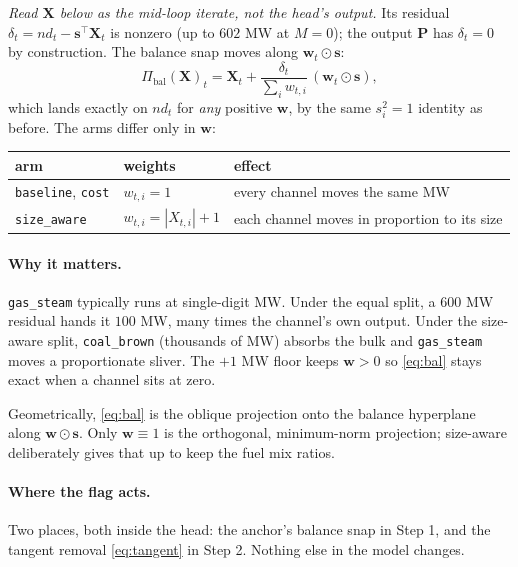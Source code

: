 \documentclass[11pt]{article}
\begin{document}
\emph{Read $\mathbf{X}$ below as the mid-loop iterate, not the head's output.}
Its residual $\delta_t=nd_t-\mathbf{s}^{\!\top}\mathbf{X}_t$ is nonzero (up to
$602$ MW at $M=0$); the output $\mathbf{P}$ has $\delta_t=0$ by construction.
The balance snap moves along $\mathbf{w}_t\odot\mathbf{s}$:
\begin{equation}
\Pi_{\mathrm{bal}}(\mathbf{X})_t=\mathbf{X}_t+\frac{\delta_t}{\sum_i w_{t,i}}\,(\mathbf{w}_t\odot\mathbf{s}),
\label{eq:bal}
\end{equation}
which lands exactly on $nd_t$ for \emph{any} positive $\mathbf{w}$, by the same
$s_i^2=1$ identity as before. The arms differ only in $\mathbf{w}$:
\begin{center}
\begin{tabular}{lll}
\toprule
arm & weights & effect \\
\midrule
\texttt{baseline}, \texttt{cost} & $w_{t,i}=1$ & every channel moves the same MW \\
\texttt{size\_aware} & $w_{t,i}=|X_{t,i}|+1$ & each channel moves in proportion to its size \\
\bottomrule
\end{tabular}
\end{center}

\paragraph{Why it matters.} \texttt{gas\_steam} typically runs at single-digit
MW. Under the equal split, a $600$ MW residual hands it $100$ MW, many times the
channel's own output. Under the size-aware split, \texttt{coal\_brown}
(thousands of MW) absorbs the bulk and \texttt{gas\_steam} moves a proportionate
sliver. The $+1$ MW floor keeps $\mathbf{w}>0$ so \eqref{eq:bal} stays exact when
a channel sits at zero.

Geometrically, \eqref{eq:bal} is the oblique projection onto the balance
hyperplane along $\mathbf{w}\odot\mathbf{s}$. Only $\mathbf{w}\equiv1$ is the
orthogonal, minimum-norm projection; size-aware deliberately gives that up to
keep the fuel mix ratios.

\paragraph{Where the flag acts.} Two places, both inside the head: the anchor's
balance snap in Step 1, and the tangent removal \eqref{eq:tangent} in Step 2.
Nothing else in the model changes.
\end{document}
